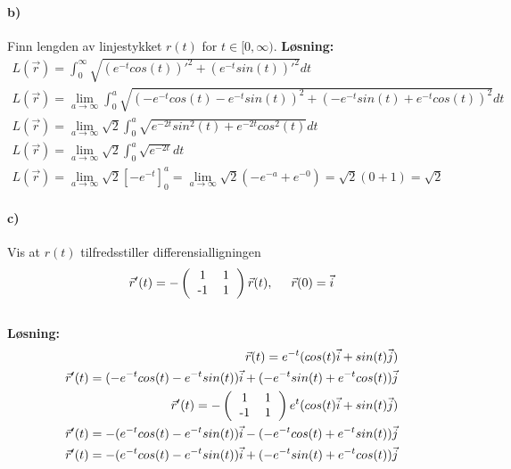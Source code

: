 \documentclass[11pt, A4paper,norsk]{article}
\begin{document}
		\paragraph{b)}
			\begin{flushleft}
Finn lengden av linjestykket $r(t)$ for $t \in [0, \infty)$.
\vspace{1mm}
\textbf{Løsning:} \\
\vspace{1mm}
				\begin{align}
L(\vec{r}) = \int_{0}^{\infty} \sqrt{(e^{- t}cos(t))'^2 + (e^{- t}sin(t))'^2} dt \nonumber\\
L(\vec{r}) = \lim_{a \rightarrow \infty} \int_{0}^{a} \sqrt{(-e^{- t}cos(t) - e^{-t}sin(t))^2 + (-e^{- t}sin(t) + e^{-t}cos(t))^2} dt \nonumber \\
L(\vec{r}) = \lim_{a \rightarrow \infty} \sqrt{2} \int_{0}^{a} \sqrt{e^{-2t}sin^2(t) + e^{- 2t}cos^2(t)} dt \nonumber \\
L(\vec{r}) = \lim_{a \rightarrow \infty} \sqrt{2} \int_{0}^{a} \sqrt{e^{-2t}} dt \nonumber \\
L(\vec{r}) = \lim_{a \rightarrow \infty} \sqrt{2} \left[ -e^{-t} \right]_{0}^{a} = \lim_{a \rightarrow \infty} \sqrt{2}(-e^{-a} + e^{-0}) = \sqrt{2}(0 + 1) = \sqrt{2} \nonumber
				\end{align}
			\end{flushleft}
		\paragraph{c)}
			\begin{flushleft}
Vis at $r(t)$ tilfredsstiller differensialligningen \\
$$ \vec{r}'(t) =
- \left( \begin{tabular}{ c c }
1 & 1 \\
-1 & 1
\end{tabular} \right) \vec{r}(t), \hspace{5mm} \vec{r}(0) = \vec{i}$$ \\
\vspace{1mm}
\textbf{Løsning:} \\
\vspace{1mm}
				\begin{align}
\vec{r}(t) = e^{-t}(cos(t)\vec{i} + sin(t)\vec{j}) \nonumber\\
\vec{r}'(t) = (-e^{-t}cos(t) - e^{-t}sin(t))\vec{i} + (-e^{-t}sin(t) + e^{-t}cos(t))\vec{j} \nonumber \\
\vec{r}'(t) =
- \left( \begin{tabular}{ c c }
1 & 1 \\
-1 & 1
\end{tabular} \right) e^{t}(cos(t)\vec{i} + sin(t)\vec{j}) \nonumber \\
\vec{r}'(t) = -(e^{-t}cos(t) - e^{-t}sin(t))\vec{i} - (-e^{-t}cos(t) + e^{-t}sin(t))\vec{j} \nonumber \\
\vec{r}'(t) = -(e^{-t}cos(t) - e^{-t}sin(t))\vec{i} + (-e^{-t}sin(t) + e^{-t}cos(t))\vec{j} \nonumber
				\end{align}
			\end{flushleft}
\end{document}
